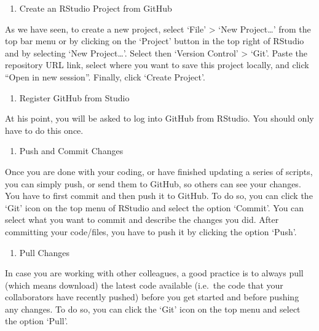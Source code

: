 \documentclass[
]{krantz}
\providecommand{\tightlist}{%
  \setlength{\itemsep}{0pt}\setlength{\parskip}{0pt}}
\begin{document}
\begin{enumerate}
\def\labelenumi{\arabic{enumi})}
\setcounter{enumi}{2}
\tightlist
\item
  Create an RStudio Project from GitHub
\end{enumerate}

As we have seen, to create a new project, select `File' \textgreater{} `New Project\ldots{}' from the top bar menu or by clicking on the `Project' button in the top right of RStudio and by selecting `New Project\ldots{}'. Select then `Version Control' \textgreater{} `Git'. Paste the repository URL link, select where you want to save this project locally, and click ``Open in new session''. Finally, click `Create Project'.

\begin{enumerate}
\def\labelenumi{\arabic{enumi})}
\setcounter{enumi}{3}
\tightlist
\item
  Register GitHub from Studio
\end{enumerate}

At his point, you will be asked to log into GitHub from RStudio. You should only have to do this once.

\begin{enumerate}
\def\labelenumi{\arabic{enumi})}
\setcounter{enumi}{4}
\tightlist
\item
  Push and Commit Changes
\end{enumerate}

Once you are done with your coding, or have finished updating a series of scripts, you can simply push, or send them to GitHub, so others can see your changes. You have to first commit and then push it to GitHub. To do so, you can click the `Git' icon on the top menu of RStudio and select the option `Commit'. You can select what you want to commit and describe the changes you did. After committing your code/files, you have to push it by clicking the option `Push'.

\begin{enumerate}
\def\labelenumi{\arabic{enumi})}
\setcounter{enumi}{5}
\tightlist
\item
  Pull Changes
\end{enumerate}

In case you are working with other colleagues, a good practice is to always pull (which means download) the latest code available (i.e.~the code that your collaborators have recently pushed) before you get started and before pushing any changes. To do so, you can click the `Git' icon on the top menu and select the option `Pull'.
\end{document}
